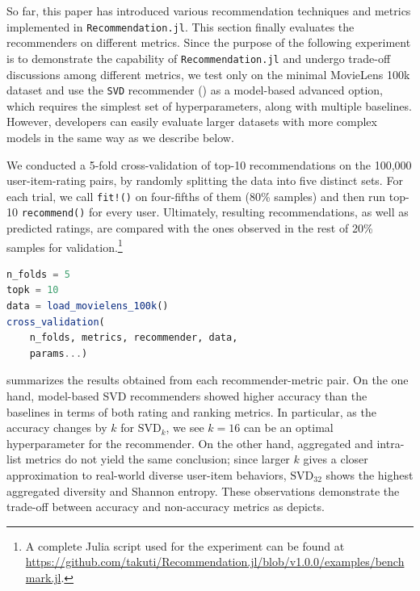 So far, this paper has introduced various recommendation techniques and metrics implemented in \texttt{Recommendation.jl}. This section finally evaluates the recommenders on different metrics. Since the purpose of the following experiment is to demonstrate the capability of \texttt{Recommendation.jl} and undergo trade-off discussions among different metrics, we test only on the minimal MovieLens 100k dataset \cite{harper2015movielens} and use the \texttt{SVD} recommender () as a model-based advanced option, which requires the simplest set of hyperparameters, along with multiple baselines. However, developers can easily evaluate larger datasets with more complex models in the same way as we describe below.

We conducted a 5-fold cross-validation of top-10 recommendations on the 100,000 user-item-rating pairs, by randomly splitting the data into five distinct sets. For each trial, we call \texttt{fit!()} on four-fifths of them (80\% samples) and then run top-10 \texttt{recommend()} for every user. Ultimately, resulting recommendations, as well as predicted ratings, are compared with the ones observed in the rest of 20\% samples for validation.\footnote{A complete Julia script used for the experiment can be found at \url{https://github.com/takuti/Recommendation.jl/blob/v1.0.0/examples/benchmark.jl}.}

\begin{lstlisting}[language = Julia]
n_folds = 5
topk = 10
data = load_movielens_100k()
cross_validation(
    n_folds, metrics, recommender, data,
    params...)
\end{lstlisting}

 summarizes the results obtained from each recommender-metric pair. On the one hand, model-based SVD recommenders showed higher accuracy than the baselines in terms of both rating and ranking metrics. In particular, as the accuracy changes by $k$ for $\mathrm{SVD}_k$, we see $k = 16$ can be an optimal hyperparameter for the recommender. On the other hand, aggregated and intra-list metrics do not yield the same conclusion; since larger $k$ gives a closer approximation to real-world diverse user-item behaviors, $\mathrm{SVD}_{32}$ shows the highest aggregated diversity and Shannon entropy. These observations demonstrate the trade-off between accuracy and non-accuracy metrics as  depicts.

